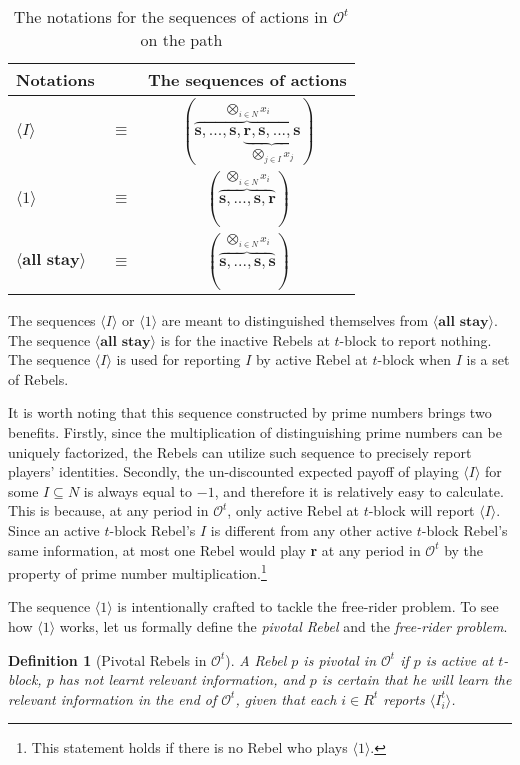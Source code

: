 \documentclass[12pt,letter]{article}
\newcommand{\Omicron}{\mathcal{O}}
\newtheorem{definition}{Definition}[section]
\theoremstyle{definition}
\theoremstyle{remark}
\theoremstyle{claim}
\begin{document}
\begin{table}[!htbp]
\caption{The notations for the sequences of actions in $\Omicron^t$ on the path}
\label{Table_msg_form}
\begin{center}
\begin{tabular}{l c c}
Notations && The sequences of actions\\
\hline
\hline
$\langle  I \rangle$ 				& $\equiv$ 			& $(\overbrace{\textbf{s},...,\textbf{s},\underbrace{\textbf{r},\textbf{s},...,\textbf{s}}_{\bigotimes_{j\in I}x_j} }^{\bigotimes_{i\in N} x_i})$  \\
$\langle 1 \rangle$	 					& $\equiv$ 			& $( \overbrace{\textbf{s},...,\textbf{s},{\textbf{r}} }^{\bigotimes_{i\in N} x_i} )$  \\
$\langle \textbf{all stay} \rangle$	 					& $\equiv$ 			& $(\overbrace{ \textbf{s},...,\textbf{s},{\textbf{s}} }^{\bigotimes_{i\in N} x_i})$  \\
\hline
\end{tabular}
\end{center}
\end{table}

The sequences $\langle I \rangle$ or $\langle 1 \rangle$ are meant to distinguished themselves from $\langle \textbf{all stay} \rangle$. The sequence $\langle \textbf{all stay} \rangle$ is for the inactive Rebels at $t$-block to report nothing. The sequence $\langle I \rangle$ is used for reporting $I$ by active Rebel at $t$-block when $I$ is a set of Rebels. 

It is worth noting that this sequence constructed by prime numbers brings two benefits. Firstly, since the multiplication of distinguishing prime numbers can be uniquely factorized, the Rebels can utilize such sequence to precisely report players' identities. Secondly, the un-discounted expected payoff of playing $\langle I \rangle$ for some $I\subseteq N$ is always equal to $-1$, and therefore it is relatively easy to calculate. This is because, at any period in $\Omicron^{t}$, only active Rebel at $t$-block will report $\langle I \rangle$. Since an active $t$-block Rebel's $I$ is different from any other active $t$-block Rebel's same information, at most one Rebel would play \textbf{r} at any period in $\Omicron^{t}$ by the property of prime number multiplication.\footnote{This statement holds if there is no Rebel who plays $\langle 1 \rangle$.} 

The sequence $\langle 1 \rangle$ is intentionally crafted to tackle the free-rider problem. To see how $\langle 1 \rangle$ works, let us formally define the \textit{pivotal Rebel} and the \textit{free-rider problem}. 
\begin{definition}[Pivotal Rebels in $\Omicron^t$]
A Rebel $p$ is pivotal in $\Omicron^t$ if $p$ is active at $t$-block, $p$ has not learnt relevant information, and $p$ is certain that he will learn the relevant information in the end of $\Omicron^t$, given that each $i\in R^t$ reports $\langle I^t_i \rangle$.
\end{definition}
\end{document}
